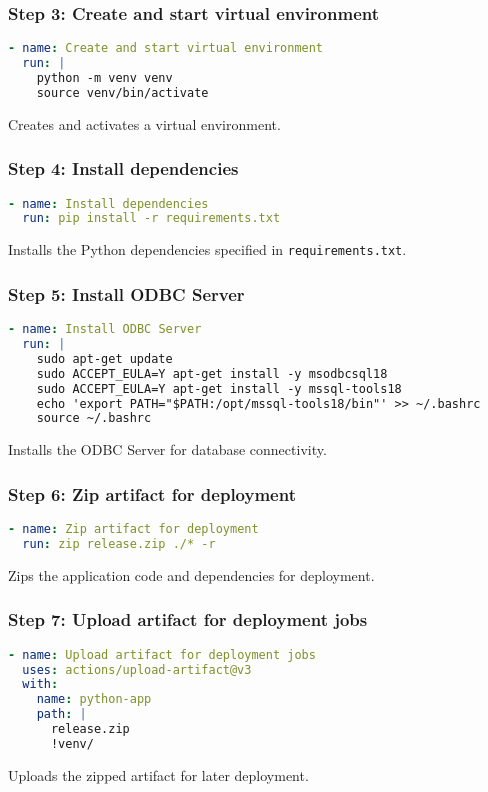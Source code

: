 \subsubsection{Step 3: Create and start virtual environment}
\begin{lstlisting}[language=yaml]
- name: Create and start virtual environment
  run: |
    python -m venv venv
    source venv/bin/activate
\end{lstlisting}
Creates and activates a virtual environment.

\subsubsection{Step 4: Install dependencies}
\begin{lstlisting}[language=yaml]
- name: Install dependencies
  run: pip install -r requirements.txt
\end{lstlisting}
Installs the Python dependencies specified in \texttt{requirements.txt}.

\subsubsection{Step 5: Install ODBC Server}
\begin{lstlisting}[language=yaml]
- name: Install ODBC Server
  run: |
    sudo apt-get update
    sudo ACCEPT_EULA=Y apt-get install -y msodbcsql18
    sudo ACCEPT_EULA=Y apt-get install -y mssql-tools18
    echo 'export PATH="$PATH:/opt/mssql-tools18/bin"' >> ~/.bashrc
    source ~/.bashrc
\end{lstlisting}
Installs the ODBC Server for database connectivity.

\subsubsection{Step 6: Zip artifact for deployment}
\begin{lstlisting}[language=yaml]
- name: Zip artifact for deployment
  run: zip release.zip ./* -r
\end{lstlisting}
Zips the application code and dependencies for deployment.

\subsubsection{Step 7: Upload artifact for deployment jobs}
\begin{lstlisting}[language=yaml]
- name: Upload artifact for deployment jobs
  uses: actions/upload-artifact@v3
  with:
    name: python-app
    path: |
      release.zip
      !venv/
\end{lstlisting}
Uploads the zipped artifact for later deployment.

